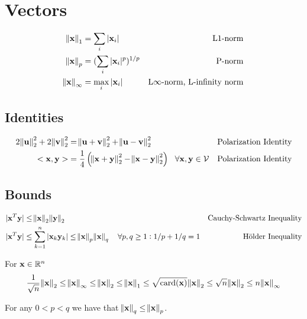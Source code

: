 \section{Vectors}

\begin{align}
\norm{\vx}_1      &= \sum_i |\vx_i|           & \textrm{L1-norm\index{L1-norm}} \\
\norm{\vx}_p      &= (\sum_i |\vx_i|^p)^{1/p} & \textrm{P-norm\index{P-norm}}   \\
\norm{\vx}_\infty &= \max_i |\vx_i|           & \textrm{L$\infty$-norm\index{L$\infty$-norm}, L-infinity norm}
\end{align}

\subsection{Identities}

\begin{align}
2\norm{\mathbf{u}}_2^2+2\norm{\mathbf{v}}_2^2 &= \norm{\mathbf{u}+\mathbf{v}}_2^2 + \norm{\mathbf{u}-\mathbf{v}}_2^2                                                      & \textrm{Polarization Identity} \\
<\mathbf{x},\mathbf{y}>                       &= \frac{1}{4}\left(\norm{\mathbf{x}+\mathbf{y}}_2^2-\norm{\mathbf{x}-\mathbf{y}}_2^2\right)~~\forall \mathbf{x},\mathbf{y}\in\mathcal{V} & \textrm{Polarization Identity}
\end{align}


\subsection{Bounds}

\begin{align}
|\mathbf{x}^T \mathbf{y}| &\le \norm{\mathbf{x}}_2 \norm{\mathbf{y}}_2 & \textrm{Cauchy-Schwartz Inequality} \\
|\mathbf{x}^T \mathbf{y}| &\le \sum_{k=1}^n |\mathbf{x}_k \mathbf{y}_k| \le \norm{\mathbf{x}}_p \norm{\mathbf{x}}_q~~~\forall p,q\ge1: 1/p+1/q=1 & \textrm{H\"older Inequality}
\end{align}

For $\mathbf{x}\in\mathbb{R}^n$
\begin{equation}
\frac{1}{\sqrt{n}}\norm{\mathbf{x}}_2
\le\norm{\mathbf{x}}_\infty
\le\norm{\mathbf{x}}_2
\le\norm{\mathbf{x}}_1
\le\sqrt{\textrm{card}(\mathbf{x})}\norm{\mathbf{x}}_2
\le\sqrt{n}\norm{\mathbf{x}}_2
\le n \norm{\mathbf{x}}_\infty
\end{equation}

For any $0<p<q$ we have that $\norm{\mathbf{x}}_q\le\norm{\mathbf{x}}_p$.
